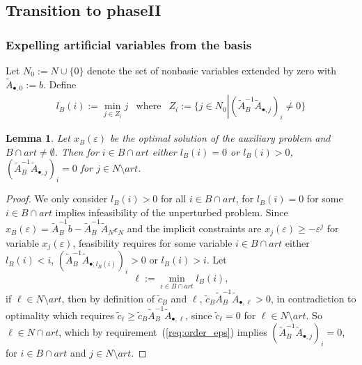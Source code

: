 \documentclass[a4paper]{article}
\newtheorem{lemma}{Lemma}
\begin{document}
\subsection{Transition to phaseII}
\subsubsection{Expelling artificial variables from the basis}
Let $N_{0}:=N \cup \{0\}$ denote the set of nonbasic variables extended by zero
with $\tilde{A}_{\bullet, 0}:=b$. Define 
\begin{eqnarray*}
  l_{B}\left(i\right):=\min_{j \in Z_{i}} j & \text{where}&
  Z_{i}:=\{ j \in N_{0} \left| \right.
  \left(\tilde{A}_{B}^{-1}\tilde{A}_{\bullet,j}\right)_{i} \neq 0 \}
\end{eqnarray*}  
\begin{lemma}
Let $x_{B}(\varepsilon)$ be the optimal solution of the auxiliary problem and
$B \cap art \neq \emptyset$. Then for $i \in B \cap art$ either
$l_{B}\left(i\right) = 0$ or $l_{B}\left(i\right) > 0$,
$(\tilde{A}_{B}^{-1}\tilde{A}_{\bullet ,j})_{i} = 0$
for $j \in N \setminus art$.
\end{lemma}
\begin{proof}
We only consider $l_{B}\left(i\right) > 0$ for all $i \in B \cap art$, for
$l_{B}\left(i\right) = 0$ for some $i \in B \cap art$ implies infeasibility of
the unperturbed problem. 
Since $x_{B}(\varepsilon) = \tilde{A}_{B}^{-1}b - \tilde{A}_{B}^{-1}
\tilde{A}_{N}\epsilon_{N}$
and the implicit constraints are $x_{j}(\varepsilon) \geq -\varepsilon^{j}$
for variable $x_{j}(\varepsilon)$, feasibility requires
for some variable $i \in B \cap art$ either $l_{B}\left(i\right) < i$,
$(\tilde{A}_{B}^{-1}\tilde{A}_{\bullet, l_{B}\left(i\right)})_{i} >
0$ or
$l_{B}\left(i\right) > i$. Let
\begin{equation*}
  \ell:= \min_{i \in B \cap art} l_{B}\left(i\right),
\end{equation*}
if $\ell \in N \setminus art$,
then by definition of $\tilde{c}_{B}$ and $\ell$,
$\tilde{c}_{B}\tilde{A}_{B}^{-1}\tilde{A}_{\bullet, \ell} > 0$,
in contradiction to optimality which requires
$\tilde{c}_{\ell} \geq
\tilde{c}_{B}\tilde{A}_{B}^{-1}\tilde{A}_{\bullet, \ell}$,
since $\tilde{c}_{\ell}=0$ for 
$\ell \in N \setminus art$.
So $\ell \in N \cap art$, which by requirement~(\ref{req:order_eps}) implies
$(\tilde{A}_{B}^{-1}\tilde{A}_{\bullet, j})_{i}=0$, for
$i \in B \cap art$ and $j \in N \setminus art$. 
\end{proof}
\end{document}
